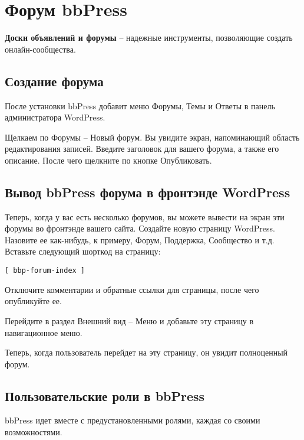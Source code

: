 \chapter{Форум bbPress}
\label{sec:chapter_forum}

\textbf{Доски объявлений и форумы} – надежные инструменты, позволяющие создать онлайн-сообщества.

\section{Создание форума}
\label{sec:part_create_forum}

После установки bbPress добавит меню Форумы, Темы и Ответы в панель администратора WordPress.

Щелкаем по Форумы – Новый форум. Вы увидите экран, напоминающий область редактирования записей. Введите заголовок для вашего форума, а также его описание. После чего щелкните по кнопке Опубликовать.



\section{Вывод bbPress форума в фронтэнде WordPress}
\label{sec:part_forum_page}


Теперь, когда у вас есть несколько форумов, вы можете вывести на экран эти форумы во фронтэнде вашего сайта. Создайте новую страницу WordPress. Назовите ее как-нибудь, к примеру, Форум, Поддержка, Сообщество и т.д. Вставьте следующий шорткод на страницу:

\small
\begin{lstlisting}[frame=single, breaklines=true]
[ bbp-forum-index ]
\end{lstlisting}
\normalsize


Отключите комментарии и обратные ссылки для страницы, после чего опубликуйте ее.

Перейдите в раздел Внешний вид – Меню и добавьте эту страницу в навигационное меню.

Теперь, когда пользователь перейдет на эту страницу, он увидит полноценный форум.

\section{Пользовательские роли в bbPress}
\label{sec:part_forum_users}

bbPress идет вместе с предустановленными ролями, каждая со своими возможностями.

